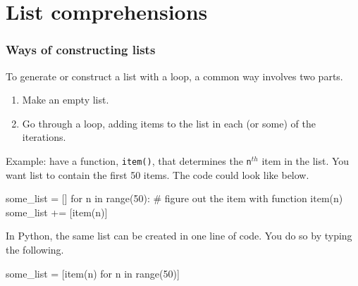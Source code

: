 \documentclass{beamer}
\newenvironment{codeblock}
    {\hfill\begin{beamerboxesrounded}[lower=codecol, width=0.8\textwidth]
    \medskip

    }
    { 
    \end{beamerboxesrounded}\hfill
    }
\theoremstyle{example}
\newcommand{\ttt}[1]{{\small\texttt{#1}}}
\begin{document}
\section{List comprehensions}
\begin{frame}[fragile]
\frametitle{Ways of constructing lists}

To generate or construct a list with a loop, a common way involves two parts.
\begin{enumerate}
	\item Make an empty list.
	\item Go through a loop, adding items to the list in each (or some) of the iterations.
\end{enumerate}

\pause
Example: have a function, \ttt{item()}, that determines the \ttt{n}$^{th}$ item in the list. You want list to contain the first 50 items. The code could look like below. 

\begin{codeblock}

\begin{python}
some_list = []
for n in range(50):
    # figure out the item with function item(n)
    some_list += [item(n)]
\end{python}

\end{codeblock}

\pause
In Python, the same list can be created in one line of code. You do so by typing the following.

\begin{codeblock}

\begin{python}[numbers=none]
some_list = [item(n) for n in range(50)]
\end{python}

\end{codeblock}

\end{frame}
\end{document}
